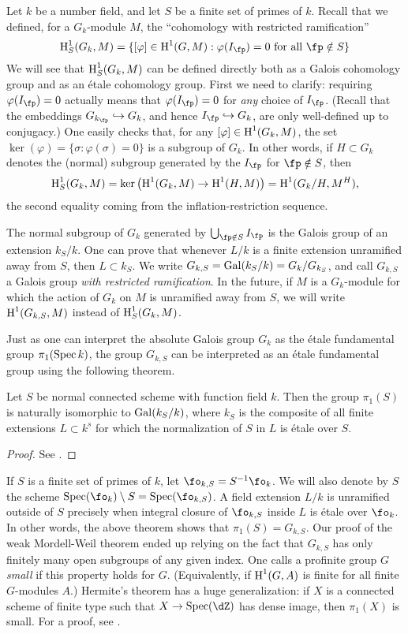 \documentclass{article}
\begin{document}
Let $k$ be a number field, and let $S$ be a finite set of primes of $k$. Recall 
that we defined, for a $G_k$-module $M$, the ``cohomology with restricted 
ramification'' 
\[
  \h_S^1(G_k,M) = \{[\varphi]\in \h^1(G,M) : \varphi(I_\fp) = 0\text{ for all }\fp\notin S\}
\]
We will see that $\operatorname{H}_S^1(G_k,M)$ can be defined directly both as a Galois 
cohomology group and as an \'etale cohomology group. First we need to clarify: 
requiring $\varphi(I_\fp)=0$ actually means that $\varphi(I_\fp)=0$ for 
\emph{any} choice of $I_\fp$. (Recall that the embeddings 
$G_{k_\fp}\hookrightarrow G_k$, and hence $I_\fp\hookrightarrow G_k$, are only 
well-defined up to conjugacy.) One easily checks that, for any 
$[\varphi]\in \operatorname{H}^1(G_k,M)$, the set 
$\ker(\varphi)=\{\sigma:\varphi(\sigma)=0\}$ is a subgroup of $G_k$. In other 
words, if $H\subset G_k$ denotes the (normal) subgroup generated by the 
$I_\fp$ for $\fp\notin S$, then 
\[
  \operatorname{H}_S^1(G_k,M) = \ker\left(\operatorname{H}^1(G_k,M) \to \operatorname{H}^1(H,M)\right) 
                = \operatorname{H}^1(G_k/H,M^H) \text{,}
\]
the second equality coming from the inflation-restriction sequence. 

The normal subgroup of $G_k$ generated by $\bigcup_{\fp\notin S} I_\fp$ is the 
Galois group of an extension $k_S/k$. One can prove that whenever $L/k$ is a 
finite extension unramified away from $S$, then $L\subset k_S$. We write 
$G_{k,S}=\operatorname{Gal}(k_S/k) = G_k/G_{k_S}$, and call $G_{k,S}$ a Galois 
group \emph{with restricted ramification}. In the future, if $M$ is a 
$G_k$-module for which the action of $G_k$ on $M$ is unramified away from 
$S$, we will write $\operatorname{H}^1(G_{k,S},M)$ instead of $\operatorname{H}_S^1(G_k,M)$. 

Just as one can interpret the 
absolute Galois group $G_k$ as the \'etale fundamental group 
$\pi_1(\operatorname{Spec} k)$, the group $G_{k,S}$ can be interpreted as an \'etale 
fundamental group using the following theorem.

\begin{theorem}
Let $S$ be normal connected scheme with function field $k$. Then the group 
$\pi_1(S)$ is naturally isomorphic to $\operatorname{Gal}(k_S/k)$, where $k_S$ is the 
composite of all finite extensions $L\subset k^s$ for which the normalization 
of $S$ in $L$ is \'etale over $S$. 
\end{theorem}
\begin{proof}
See \cite[5.4.9]{sz09}.
\end{proof}

If $S$ is a finite set of primes of $k$, let $\fo_{k,S}=S^{-1}\fo_k$. We will 
also denote by $S$ the scheme $\spec(\fo_k)\setminus S=\spec(\fo_{k,S})$. A 
field extension $L/k$ is unramified outside of $S$ precisely when integral 
closure of $\fo_{k,S}$ inside $L$ is \'etale over $\fo_k$. In other words, the 
above theorem shows that $\pi_1(S)=G_{k,S}$. Our proof of the weak Mordell-Weil 
theorem ended up relying on the fact that $G_{k,S}$ has only finitely many open 
subgroups of any given index. One calls a profinite group $G$ \emph{small} if 
this property holds for $G$. (Equivalently, if $\operatorname{H}^1(G,A)$ is finite for all 
finite $G$-modules $A$.) Hermite's theorem has a huge generalization: if $X$ is 
a connected scheme of finite type such that $X\to \spec(\dZ)$ has dense image, 
then $\pi_1(X)$ is small. For a proof, see \cite[2.8]{hh09}. 
\end{document}

